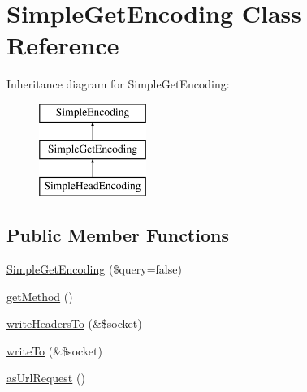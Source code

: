 \hypertarget{class_simple_get_encoding}{
\section{SimpleGetEncoding Class Reference}
\label{class_simple_get_encoding}
}
Inheritance diagram for SimpleGetEncoding:\begin{figure}[H]
\begin{center}
\leavevmode
\includegraphics[height=3.000000cm]{class_simple_get_encoding}
\end{center}
\end{figure}
\subsection*{Public Member Functions}
\begin{DoxyCompactItemize}
\item 
\hyperlink{class_simple_get_encoding_a4f6014c0234211c8281c85e9f67c2a2e}{SimpleGetEncoding} (\$query=false)
\item 
\hyperlink{class_simple_get_encoding_ab8adaa71183f17a87edbcc7d27827861}{getMethod} ()
\item 
\hyperlink{class_simple_get_encoding_af4b6545b1d70c926b32530bc388cf73e}{writeHeadersTo} (\&\$socket)
\item 
\hyperlink{class_simple_get_encoding_a5d9365a3daabf8ec9cd6f33d3ed1c942}{writeTo} (\&\$socket)
\item 
\hyperlink{class_simple_get_encoding_a29db0a2343a6e8d7eea3371bcb64059c}{asUrlRequest} ()
\end{DoxyCompactItemize}


